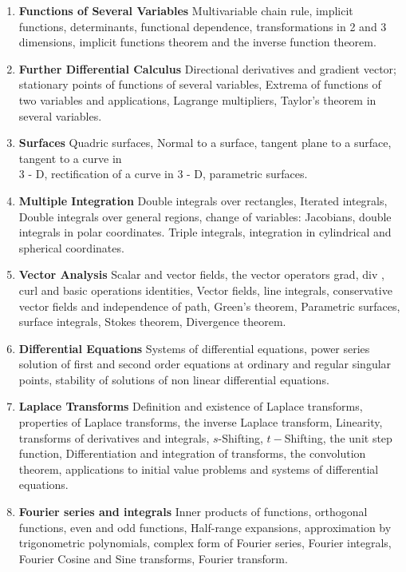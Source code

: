 \documentclass[11pt,a4paper]{article}
\theoremstyle{definition}
\begin{document}
\begin{enumerate}
\item \textbf{Functions of Several Variables}
Multivariable chain rule, implicit functions, determinants, functional dependence, transformations in 2 and 3 dimensions, implicit functions theorem and the inverse function theorem.

\item \textbf{Further Differential Calculus}
Directional derivatives and gradient vector; stationary points of functions of several variables, Extrema of functions of two  variables and applications, Lagrange multipliers, Taylor's theorem in several variables.

\item \textbf{Surfaces}
Quadric surfaces, Normal to a surface, tangent plane to a surface, tangent to a curve in\\ 3 - D, rectification of a curve in 3 - D, parametric surfaces.

\pagebreak
\thispagestyle{empty}
\item \textbf{Multiple Integration}
Double integrals over rectangles, Iterated integrals, Double integrals over general regions, change of variables: Jacobians, double integrals in polar coordinates. Triple integrals, integration in cylindrical and spherical coordinates.

\item\textbf{Vector Analysis}
Scalar and vector fields, the vector operators grad, div , curl and basic operations identities, Vector fields, line integrals, conservative vector fields and independence of path, Green's theorem, Parametric surfaces, surface integrals, Stokes theorem, Divergence theorem.

\item \textbf{Differential Equations}
Systems of differential equations, power series solution of first and second order equations at ordinary and regular singular points, stability of solutions of non linear differential equations.

\item \textbf{Laplace Transforms}
Definition and existence of Laplace transforms, properties of Laplace transforms, the inverse Laplace transform, Linearity, transforms of derivatives and integrals, $s$-Shifting, $t-$Shifting, the unit step function, Differentiation and integration of transforms, the convolution theorem, applications to initial value problems and systems of differential equations.

\item \textbf{Fourier series and integrals}
Inner products of functions, orthogonal functions, even and odd functions, Half-range expansions, approximation by trigonometric polynomials, complex form of Fourier series, Fourier integrals, Fourier Cosine and Sine transforms, Fourier transform.
\end{enumerate}
\end{document}
